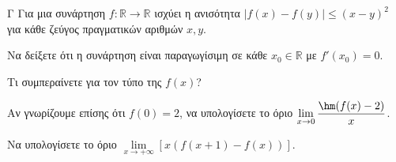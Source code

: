 \begin{thema}{Γ}
Για μια συνάρτηση $f: \mathbb{R} \to \mathbb{R}$ ισχύει η ανισότητα $|f(x) - f(y)| \le (x-y)^2$ για κάθε ζεύγος πραγματικών αριθμών $x, y$.
\begin{erwthma}
  \item Να δείξετε ότι η συνάρτηση είναι παραγωγίσιμη σε κάθε $x_0 \in \mathbb{R}$ με $f'(x_0) = 0$.
  \item Τι συμπεραίνετε για τον τύπο της $f(x)$?
  \item Αν γνωρίζουμε επίσης ότι $f(0) = 2$, να υπολογίσετε το όριο $\lim\limits_{x \to 0} \dfrac{\hm(f(x) - 2)}{x}$.
  \item Να υπολογίσετε το όριο $\lim\limits_{x \to +\infty} [ x (f(x+1) - f(x)) ]$.
\end{erwthma}
\end{thema}
